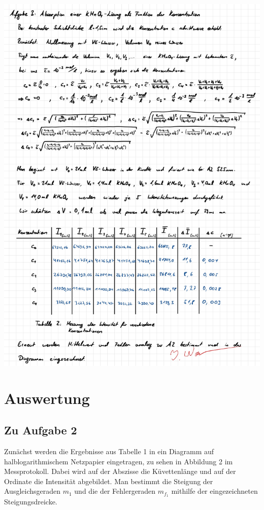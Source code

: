\documentclass{article}
\begin{document}
\includegraphics[width=\textwidth]{graphics/mess5.jpg}
\newpage

\addtocounter{table}{3}

\section{Auswertung}

\subsection{Zu Aufgabe 2}

Zunächst werden die Ergebnisse aus Tabelle 1 in ein Diagramm auf halblogarithmischem Netzpapier eingetragen, zu sehen in Abbildung 2 im Messprotokoll. Dabei wird auf der Abszisse die Küvettenlänge und auf der Ordinate die Intensität abgebildet. Man bestimmt die Steigung der Ausgleichsgeraden $m_1$ und die der Fehlergeraden $m_{f_1}$ mithilfe der eingezeichneten Steigungsdreicke.
\end{document}
